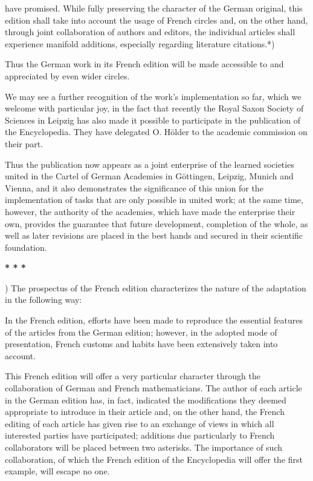\thispagestyle{fancy}

\vspace{0.5cm}

have promised. While fully preserving the character of the German original, this edition shall take into account the usage of French circles and, on the other hand, through joint collaboration of authors and editors, the individual articles shall experience manifold additions, especially regarding literature citations.*)

Thus the German work in its French edition will be made accessible to and appreciated by even wider circles.

We may see a further recognition of the work's implementation so far, which we welcome with particular joy, in the fact that recently the Royal Saxon Society of Sciences in Leipzig has also made it possible to participate in the publication of the Encyclopedia. They have delegated O. Hölder to the academic commission on their part.

Thus the publication now appears as a joint enterprise of the learned societies united in the Cartel of German Academies in Göttingen, Leipzig, Munich and Vienna, and it also demonstrates the significance of this union for the implementation of tasks that are only possible in united work; at the same time, however, the authority of the academies, which have made the enterprise their own, provides the guarantee that future development, completion of the whole, as well as later revisions are placed in the best hands and secured in their scientific foundation.

\centerline{\textbf{* * *}}

\vfill
\leftline{\rule{2in}{0.4pt}}
\vspace{0.2cm}
{\footnotesize *) The prospectus of the French edition characterizes the nature of the adaptation in the following way:

In the French edition, efforts have been made to reproduce the essential features of the articles from the German edition; however, in the adopted mode of presentation, French customs and habits have been extensively taken into account.

This French edition will offer a very particular character through the collaboration of German and French mathematicians. The author of each article in the German edition has, in fact, indicated the modifications they deemed appropriate to introduce in their article and, on the other hand, the French editing of each article has given rise to an exchange of views in which all interested parties have participated; additions due particularly to French collaborators will be placed between two asterisks. The importance of such collaboration, of which the French edition of the Encyclopedia will offer the first example, will escape no one.

}
